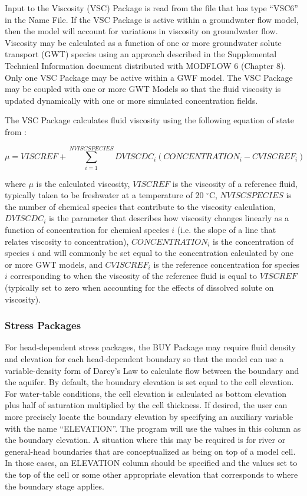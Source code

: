 Input to the Viscosity (VSC) Package is read from the file that has type ``VSC6'' in the Name File.  If the VSC Package is active within a groundwater flow model, then the model will account for variations in viscosity on groundwater flow.  Viscosity may be calculated as a function of one or more groundwater solute transport (GWT) species using an approach described in the Supplemental Technical Information document distributed with MODFLOW 6 (Chapter 8).  Only one VSC Package may be active within a GWF model. The VSC Package may be coupled with one or more GWT Models so that the fluid viscosity is updated dynamically with one or more simulated concentration fields.

The VSC Package calculates fluid viscosity using the following equation of state from \cite{langevin2008seawat}:

\begin{equation}
\label{eqn:volumeconservationdiscrete}
\mu = VISCREF + \sum_{i=1}^{NVISCSPECIES} DVISCDC_i \left ( CONCENTRATION_i - CVISCREF_i \right )
\end{equation}

\noindent where $\mu$ is the calculated viscosity, $VISCREF$ is the viscosity of a reference fluid, typically taken to be freshwater at a temperature of 20 $^{\circ}$C, $NVISCSPECIES$ is the number of chemical species that contribute to the viscosity calculation, $DVISCDC_i$ is the parameter that describes how viscosity changes linearly as a function of concentration for chemical species $i$ (i.e. the slope of a line that relates viscosity to concentration), $CONCENTRATION_i$ is the concentration of species $i$ and will commonly be set equal to the concentration calculated by one or more GWT models, and $CVISCREF_i$ is the reference concentration for species $i$ corresponding to when the viscosity of the reference fluid is equal to $VISCREF$ (typically set to zero when accounting for the effects of dissolved solute on viscosity).

\subsubsection{Stress Packages}
For head-dependent stress packages, the BUY Package may require fluid density and elevation for each head-dependent boundary so that the model can use a variable-density form of Darcy's Law to calculate flow between the boundary and the aquifer.  By default, the boundary elevation is set equal to the cell elevation.  For water-table conditions, the cell elevation is calculated as bottom elevation plus half of saturation multiplied by the cell thickness.  If desired, the user can more precisely locate the boundary elevation by specifying an auxiliary variable with the name ``ELEVATION''.  The program will use the values in this column as the boundary elevation.  A situation where this may be required is for river or general-head boundaries that are conceptualized as being on top of a model cell.  In those cases, an ELEVATION column should be specified and the values set to the top of the cell or some other appropriate elevation that corresponds to where the boundary stage applies.

